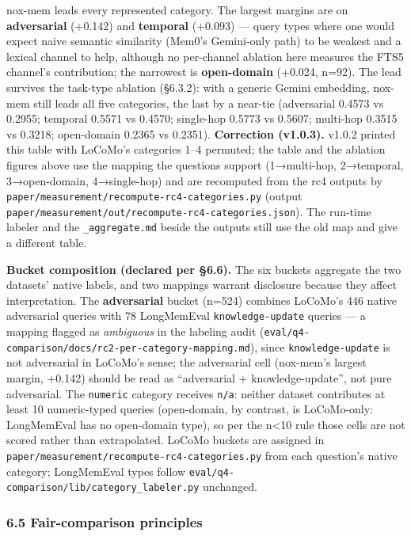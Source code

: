 \documentclass[
]{article}
\begin{document}
nox-mem leads every represented category. The largest margins are on
\textbf{adversarial} (+0.142) and \textbf{temporal} (+0.093) --- query
types where one would expect naive semantic similarity (Mem0's
Gemini-only path) to be weakest and a lexical channel to help, although
no per-channel ablation here measures the FTS5 channel's contribution;
the narrowest is \textbf{open-domain} (+0.024, n=92). The lead survives
the task-type ablation (§6.3.2): with a generic Gemini embedding,
nox-mem still leads all five categories, the last by a near-tie
(adversarial 0.4573 vs 0.2955; temporal 0.5571 vs 0.4570; single-hop
0.5773 vs 0.5607; multi-hop 0.3515 vs 0.3218; open-domain 0.2365 vs
0.2351). \textbf{Correction (v1.0.3).} v1.0.2 printed this table with
LoCoMo's categories 1--4 permuted; the table and the ablation figures
above use the mapping the questions support (1→multi-hop, 2→temporal,
3→open-domain, 4→single-hop) and are recomputed from the rc4 outputs by
\texttt{paper/measurement/recompute-rc4-categories.py} (output
\texttt{paper/measurement/out/recompute-rc4-categories.json}). The
run-time labeler and the \texttt{\_aggregate.md} beside the outputs
still use the old map and give a different table.

\textbf{Bucket composition (declared per §6.6).} The six buckets
aggregate the two datasets' native labels, and two mappings warrant
disclosure because they affect interpretation. The \textbf{adversarial}
bucket (n=524) combines LoCoMo's 446 native adversarial queries with 78
LongMemEval \texttt{knowledge-update} queries --- a mapping flagged as
\emph{ambiguous} in the labeling audit
(\texttt{eval/q4-comparison/docs/rc2-per-category-mapping.md}), since
\texttt{knowledge-update} is not adversarial in LoCoMo's sense; the
adversarial cell (nox-mem's largest margin, +0.142) should be read as
``adversarial + knowledge-update'', not pure adversarial. The
\texttt{numeric} category receives \texttt{n/a}: neither dataset
contributes at least 10 numeric-typed queries (open-domain, by contrast,
is LoCoMo-only: LongMemEval has no open-domain type), so per the
n\textless10 rule those cells are not scored rather than extrapolated.
LoCoMo buckets are assigned in
\texttt{paper/measurement/recompute-rc4-categories.py} from each
question's native category; LongMemEval types follow
\texttt{eval/q4-comparison/lib/category\_labeler.py} unchanged.

\subsubsection{6.5 Fair-comparison
principles}\label{fair-comparison-principles}
\end{document}

